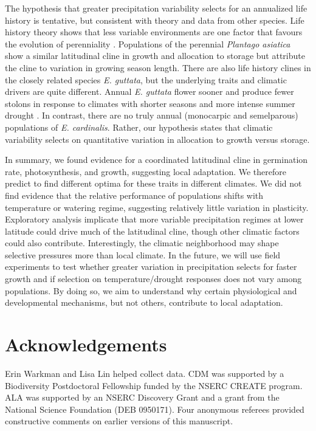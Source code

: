 \documentclass[11pt, oneside]{article}
\begin{document}
The hypothesis that greater precipitation variability selects for an annualized life history is tentative, but consistent with theory and data from other species. Life history theory shows that less variable environments are one factor that favours the evolution of perenniality \citep{Stearns_1976, Iwasa_Cohen_1989, Friedman_Rubin_2015}. Populations of the perennial \textit{Plantago asiatica} show a similar latitudinal cline in growth and allocation to storage \citep{Sawada_etal_1994} but attribute the cline to variation in growing season length. There are also life history clines in the closely related species \textit{E. guttata}, but the underlying traits and climatic drivers are quite different. Annual \textit{E. guttata} flower sooner and produce fewer stolons in response to climates with shorter seasons and more intense summer drought \citep{Lowry_Willis_2010, Friedman_etal_2015, Kooyers_etal_2015}. In contrast, there are no truly annual (monocarpic and semelparous) populations of \textit{E. cardinalis}. Rather, our hypothesis states that climatic variability selects on quantitative variation in allocation to growth versus storage. 

In summary, we found evidence for a coordinated latitudinal cline in germination rate, photosynthesis, and growth, suggesting local adaptation. We therefore predict to find different optima for these traits in different climates. We did not find evidence that the relative performance of populations shifts with temperature or watering regime, suggesting relatively little variation in plasticity. Exploratory analysis implicate that more variable precipitation regimes at lower latitude could drive much of the latitudinal cline, though other climatic factors could also contribute. Interestingly, the climatic neighborhood may shape selective pressures more than local climate. In the future, we will use field experiments to test whether greater variation in precipitation selects for faster growth and if selection on temperature/drought responses does not vary among populations. By doing so, we aim to understand why certain physiological and developmental mechanisms, but not others, contribute to local adaptation.


\section*{Acknowledgements}
Erin Warkman and Lisa Lin helped collect data. CDM was supported by a Biodiversity Postdoctoral Fellowship funded by the NSERC CREATE program. ALA was supported by an NSERC Discovery Grant and a grant from the National Science Foundation (DEB 0950171). Four anonymous referees provided constructive comments on earlier versions of this manuscript.
\end{document}
